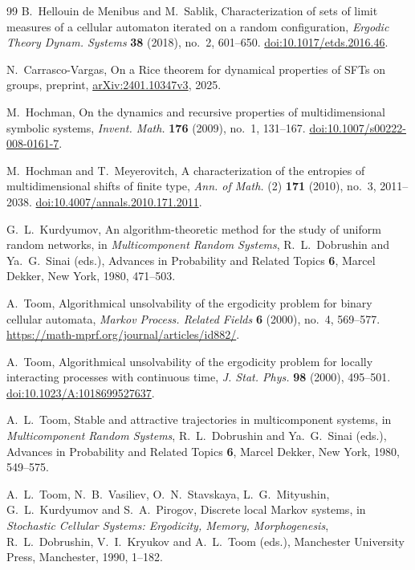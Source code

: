 \begin{thebibliography}{99}
B.~Hellouin de Menibus and M.~Sablik,
Characterization of sets of limit measures of a cellular automaton iterated
on a random configuration,
\emph{Ergodic Theory Dynam. Systems} \textbf{38} (2018), no.~2, 601--650.
\href{https://doi.org/10.1017/etds.2016.46}{doi:10.1017/etds.2016.46}.

N.~Carrasco-Vargas,
On a Rice theorem for dynamical properties of SFTs on groups,
preprint, \href{https://arxiv.org/abs/2401.10347v3}{arXiv:2401.10347v3}, 2025.

M.~Hochman,
On the dynamics and recursive properties of multidimensional symbolic systems,
\emph{Invent. Math.} \textbf{176} (2009), no.~1, 131--167.
\href{https://doi.org/10.1007/s00222-008-0161-7}{doi:10.1007/s00222-008-0161-7}.

M.~Hochman and T.~Meyerovitch,
A characterization of the entropies of multidimensional shifts of finite type,
\emph{Ann. of Math.} (2) \textbf{171} (2010), no.~3, 2011--2038.
\href{https://doi.org/10.4007/annals.2010.171.2011}{doi:10.4007/annals.2010.171.2011}.

G.~L.~Kurdyumov,
An algorithm-theoretic method for the study of uniform random networks,
in \emph{Multicomponent Random Systems},
R.~L.~Dobrushin and Ya.~G.~Sinai (eds.),
Advances in Probability and Related Topics \textbf{6},
Marcel Dekker, New York, 1980, 471--503.

A.~Toom,
Algorithmical unsolvability of the ergodicity problem for binary cellular automata,
\emph{Markov Process. Related Fields} \textbf{6} (2000), no.~4, 569--577.
\url{https://math-mprf.org/journal/articles/id882/}.

A.~Toom,
Algorithmical unsolvability of the ergodicity problem for locally interacting
processes with continuous time,
\emph{J. Stat. Phys.} \textbf{98} (2000), 495--501.
\href{https://doi.org/10.1023/A:1018699527637}{doi:10.1023/A:1018699527637}.

A.~L.~Toom,
Stable and attractive trajectories in multicomponent systems,
in \emph{Multicomponent Random Systems},
R.~L.~Dobrushin and Ya.~G.~Sinai (eds.),
Advances in Probability and Related Topics \textbf{6},
Marcel Dekker, New York, 1980, 549--575.

A.~L.~Toom, N.~B.~Vasiliev, O.~N.~Stavskaya, L.~G.~Mityushin,
G.~L.~Kurdyumov and S.~A.~Pirogov,
Discrete local Markov systems,
in \emph{Stochastic Cellular Systems: Ergodicity, Memory, Morphogenesis},
R.~L.~Dobrushin, V.~I.~Kryukov and A.~L.~Toom (eds.),
Manchester University Press, Manchester, 1990, 1--182.


\end{thebibliography}
